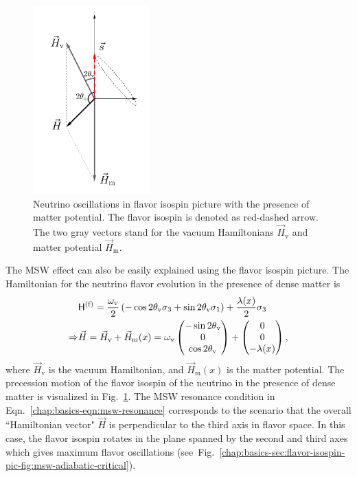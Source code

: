 \begin{figure}[htbp]
    \centering
    \includegraphics[width=0.4\textwidth]{chapters/assets/matter/matter-effect-notsolarge-density}
    \caption{Neutrino oscillations in flavor isospin picture with the presence of matter potential. The flavor isospin is denoted as red-dashed arrow. The two gray vectors stand for the vacuum Hamiltonians $\vec H_{\mathrm v}$ and matter potential $\vec H_{\mathrm m}$.}
    \label{chap:basics-sec:flavor-isospin-pic-fig:matter-effect-notsolarge-density}
\end{figure}

The MSW effect can also be easily explained using the flavor isospin picture. The Hamiltonian for the neutrino flavor evolution in the presence of dense matter is
\begin{align}
    &\mathsf H^{(\mathrm f)} =  \frac{\omega_{\mathrm{v}}}{2}\left( - \cos 2\theta_{\mathrm{v}} {\sigma_3} + \sin 2\theta_{\mathrm{v}} {\sigma_1} \right)   + \frac{\lambda(x)}{2} {\sigma_3} \\
    \Rightarrow &\vec H =  \vec H_{\mathrm v} + \vec H_{\mathrm m}(x)
     = \omega_{\mathrm v}\begin{pmatrix}
    - \sin 2\theta_{\mathrm v} \\
    0 \\
    \cos 2\theta_{\mathrm v}
    \end{pmatrix}   + \begin{pmatrix}
    0\\
    0\\
    - \lambda(x)
    \end{pmatrix}  ,
\end{align}
where $\vec H_{\mathrm v}$ is the vacuum Hamiltonian, and $\vec H_{\mathrm m}(x)$ is the matter potential. The precession motion of the flavor isospin of the neutrino in the presence of dense matter is visualized in Fig.~\ref{chap:basics-sec:flavor-isospin-pic-fig:matter-effect-notsolarge-density}. The MSW resonance condition in Eqn.~\eqref{chap:basics-eqn:msw-resonance} corresponds to the scenario that the overall ``Hamiltonian vector" $\vec H$ is perpendicular to the third axis in flavor space. In this case, the flavor isospin rotates in the plane spanned by the second and third axes which gives maximum flavor oscillations (see~Fig.~\ref{chap:basics-sec:flavor-isospin-pic-fig:msw-adiabatic-critical}).

